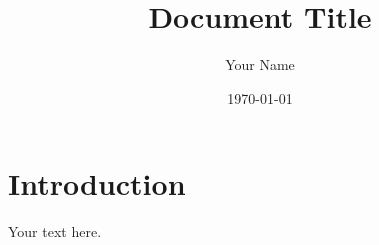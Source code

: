 \documentclass{article}
\title{Document Title}
\author{Your Name}
\date{\today}
\begin{document}
\maketitle

\section{Introduction}
Your text here.
\end{document}
